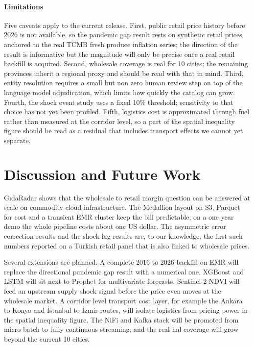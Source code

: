 \documentclass[conference]{IEEEtran}
\begin{document}
\paragraph{Limitations} Five caveats apply to the current release. First, public retail price history before 2026 is not available, so the pandemic gap result rests on synthetic retail prices anchored to the real TCMB fresh produce inflation series; the direction of the result is informative but the magnitude will only be precise once a real retail backfill is acquired. Second, wholesale coverage is real for 10 cities; the remaining provinces inherit a regional proxy and should be read with that in mind. Third, entity resolution requires a small but non zero human review step on top of the language model adjudication, which limits how quickly the catalog can grow. Fourth, the shock event study uses a fixed 10\% threshold; sensitivity to that choice has not yet been profiled. Fifth, logistics cost is approximated through fuel rather than measured at the corridor level, so a part of the spatial inequality figure should be read as a residual that includes transport effects we cannot yet separate.

\section{Discussion and Future Work}
\label{sec:concl}

GıdaRadar shows that the wholesale to retail margin question can be answered at scale on commodity cloud infrastructure. The Medallion layout on S3, Parquet for cost and a transient EMR cluster keep the bill predictable; on a one year demo the whole pipeline costs about one US dollar. The asymmetric error correction results and the shock lag results are, to our knowledge, the first such numbers reported on a Turkish retail panel that is also linked to wholesale prices.

Several extensions are planned. A complete 2016 to 2026 backfill on EMR will replace the directional pandemic gap result with a numerical one. XGBoost and LSTM will sit next to Prophet for multivariate forecasts. Sentinel-2 NDVI \cite{sentinel2} will feed an upstream supply shock signal before the price even moves at the wholesale market. A corridor level transport cost layer, for example the Ankara to Konya and İstanbul to İzmir routes, will isolate logistics from pricing power in the spatial inequality figure. The NiFi and Kafka stack will be promoted from micro batch to fully continuous streaming, and the real hal coverage will grow beyond the current 10 cities.
\end{document}
